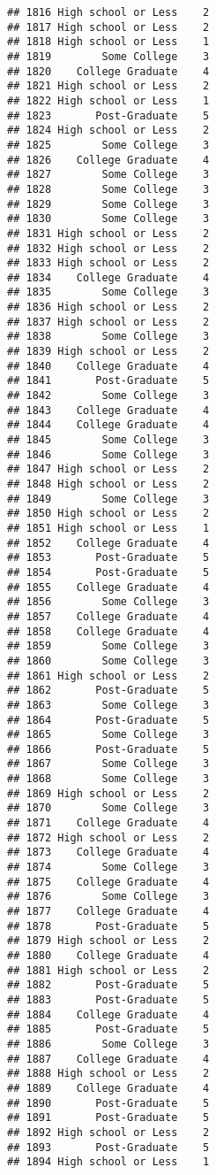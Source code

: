 \documentclass[
]{article}
\begin{document}
\begin{verbatim}
## 1816 High school or Less    2
## 1817 High school or Less    2
## 1818 High school or Less    1
## 1819        Some College    3
## 1820    College Graduate    4
## 1821 High school or Less    2
## 1822 High school or Less    1
## 1823       Post-Graduate    5
## 1824 High school or Less    2
## 1825        Some College    3
## 1826    College Graduate    4
## 1827        Some College    3
## 1828        Some College    3
## 1829        Some College    3
## 1830        Some College    3
## 1831 High school or Less    2
## 1832 High school or Less    2
## 1833 High school or Less    2
## 1834    College Graduate    4
## 1835        Some College    3
## 1836 High school or Less    2
## 1837 High school or Less    2
## 1838        Some College    3
## 1839 High school or Less    2
## 1840    College Graduate    4
## 1841       Post-Graduate    5
## 1842        Some College    3
## 1843    College Graduate    4
## 1844    College Graduate    4
## 1845        Some College    3
## 1846        Some College    3
## 1847 High school or Less    2
## 1848 High school or Less    2
## 1849        Some College    3
## 1850 High school or Less    2
## 1851 High school or Less    1
## 1852    College Graduate    4
## 1853       Post-Graduate    5
## 1854       Post-Graduate    5
## 1855    College Graduate    4
## 1856        Some College    3
## 1857    College Graduate    4
## 1858    College Graduate    4
## 1859        Some College    3
## 1860        Some College    3
## 1861 High school or Less    2
## 1862       Post-Graduate    5
## 1863        Some College    3
## 1864       Post-Graduate    5
## 1865        Some College    3
## 1866       Post-Graduate    5
## 1867        Some College    3
## 1868        Some College    3
## 1869 High school or Less    2
## 1870        Some College    3
## 1871    College Graduate    4
## 1872 High school or Less    2
## 1873    College Graduate    4
## 1874        Some College    3
## 1875    College Graduate    4
## 1876        Some College    3
## 1877    College Graduate    4
## 1878       Post-Graduate    5
## 1879 High school or Less    2
## 1880    College Graduate    4
## 1881 High school or Less    2
## 1882       Post-Graduate    5
## 1883       Post-Graduate    5
## 1884    College Graduate    4
## 1885       Post-Graduate    5
## 1886        Some College    3
## 1887    College Graduate    4
## 1888 High school or Less    2
## 1889    College Graduate    4
## 1890       Post-Graduate    5
## 1891       Post-Graduate    5
## 1892 High school or Less    2
## 1893       Post-Graduate    5
## 1894 High school or Less    1

\end{verbatim}
\end{document}
